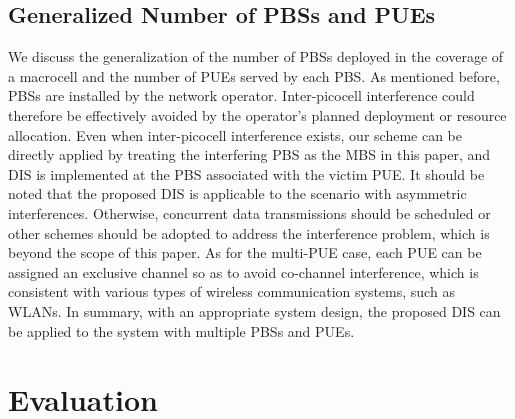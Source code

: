 \documentclass[10pt, conference, letterpaper]{IEEEtran}
\begin{document}
\subsection{Generalized Number of PBSs and PUEs}

We discuss the generalization of the number of PBSs deployed in the coverage of a macrocell
and the number of PUEs served by each PBS.
As mentioned before, PBSs are installed by the network operator.
Inter-picocell interference could therefore be effectively avoided by
the operator's planned deployment or resource allocation.
Even when inter-picocell interference exists,
our scheme can be directly applied by
treating the interfering PBS as the MBS in this paper,
and DIS is implemented at the PBS associated with the victim PUE.
It should be noted that the proposed DIS is applicable to
the scenario with asymmetric interferences.
Otherwise, concurrent data transmissions should be scheduled
or other schemes should be adopted to address the interference problem,
which is beyond the scope of this paper.
As for the multi-PUE case, each PUE can be assigned an exclusive channel so as to avoid
co-channel interference, which is consistent with various types of wireless communication systems, such as WLANs.
In summary, with an appropriate system design, the proposed DIS can be applied to the system with multiple PBSs and PUEs.

\section{Evaluation}
\setcounter{figure}{7}
\end{document}
